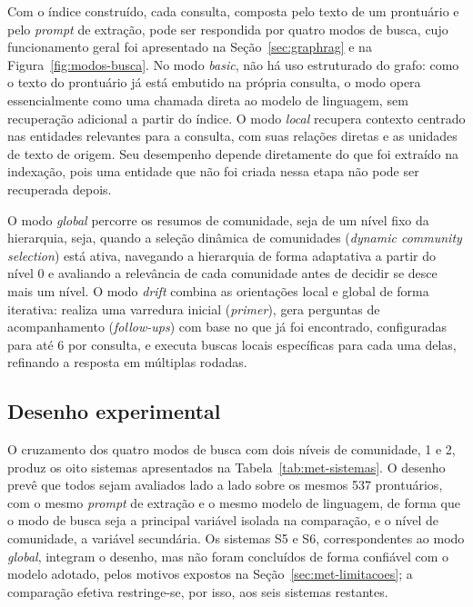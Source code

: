 Com o índice construído, cada consulta, composta pelo texto de um prontuário e pelo \textit{prompt} de extração, pode ser respondida por quatro modos de busca, cujo funcionamento geral foi apresentado na Seção~\ref{sec:graphrag} e na Figura~\ref{fig:modos-busca}. No modo \textit{basic}, não há uso estruturado do grafo: como o texto do prontuário já está embutido na própria consulta, o modo opera essencialmente como uma chamada direta ao modelo de linguagem, sem recuperação adicional a partir do índice.
O modo \textit{local} recupera contexto centrado nas entidades relevantes para a consulta, com suas relações diretas e as unidades de texto de origem. Seu desempenho depende diretamente do que foi extraído na indexação, pois uma entidade que não foi criada nessa etapa não pode ser recuperada depois.

O modo \textit{global} percorre os resumos de comunidade, seja de um nível fixo da hierarquia, seja, quando a seleção dinâmica de comunidades (\textit{dynamic community selection}) está ativa, navegando a hierarquia de forma adaptativa a partir do nível 0 e avaliando a relevância de cada comunidade antes de decidir se desce mais um nível. O modo \textit{drift} combina as orientações local e global de forma iterativa: realiza uma varredura inicial (\textit{primer}), gera perguntas de acompanhamento (\textit{follow-ups}) com base no que já foi encontrado, configuradas para até 6 por consulta, e executa buscas locais específicas para cada uma delas, refinando a resposta em múltiplas rodadas.

\subsection{Desenho experimental}\label{sec:met-desenho}

O cruzamento dos quatro modos de busca com dois níveis de comunidade, 1 e 2, produz os oito sistemas apresentados na Tabela~\ref{tab:met-sistemas}. O desenho prevê que todos sejam avaliados lado a lado sobre os mesmos 537 prontuários, com o mesmo \textit{prompt} de extração e o mesmo modelo de linguagem, de forma que o modo de busca seja a principal variável isolada na comparação, e o nível de comunidade, a variável secundária. Os sistemas S5 e S6, correspondentes ao modo \textit{global}, integram o desenho, mas não foram concluídos de forma confiável com o modelo adotado, pelos motivos expostos na Seção~\ref{sec:met-limitacoes}; a comparação efetiva restringe-se, por isso, aos seis sistemas restantes.

